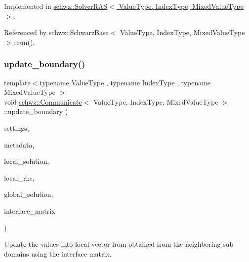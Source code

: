 Implemented in \hyperlink{classschwz_1_1SolverRAS_adc313354f7ae256d375316516d0f655e}{schwz\+::\+Solver\+R\+A\+S$<$ Value\+Type, Index\+Type, Mixed\+Value\+Type $>$}.



Referenced by schwz\+::\+Schwarz\+Base$<$ Value\+Type, Index\+Type, Mixed\+Value\+Type $>$\+::run().

\mbox{\label{classschwz_1_1Communicate_a371fb6c61c0bd9b619bbe7e154d18696}} 
\subsubsection{\texorpdfstring{update\+\_\+boundary()}{update\_boundary()}}
{\footnotesize\ttfamily template$<$typename Value\+Type , typename Index\+Type , typename Mixed\+Value\+Type $>$ \\
void \hyperlink{classschwz_1_1Communicate}{schwz\+::\+Communicate}$<$ Value\+Type, Index\+Type, Mixed\+Value\+Type $>$\+::update\+\_\+boundary (\begin{DoxyParamCaption}\item[{const \hyperlink{structschwz_1_1Settings}{Settings} \&}]{settings,  }\item[{const \hyperlink{structschwz_1_1Metadata}{Metadata}$<$ Value\+Type, Index\+Type $>$ \&}]{metadata,  }\item[{std\+::shared\+\_\+ptr$<$ gko\+::matrix\+::\+Dense$<$ Value\+Type $>$$>$ \&}]{local\+\_\+solution,  }\item[{const std\+::shared\+\_\+ptr$<$ gko\+::matrix\+::\+Dense$<$ Value\+Type $>$$>$ \&}]{local\+\_\+rhs,  }\item[{const std\+::shared\+\_\+ptr$<$ gko\+::matrix\+::\+Dense$<$ Value\+Type $>$$>$ \&}]{global\+\_\+solution,  }\item[{const std\+::shared\+\_\+ptr$<$ gko\+::matrix\+::\+Csr$<$ Value\+Type, Index\+Type $>$$>$ \&}]{interface\+\_\+matrix }\end{DoxyParamCaption})\hspace{0.3cm}{\ttfamily [pure virtual]}}



Update the values into local vector from obtained from the neighboring sub-\/domains using the interface matrix. 



